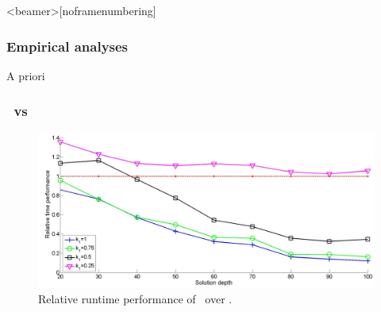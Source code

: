 \begin{frame}<beamer>[noframenumbering]
\frametitle{Empirical analyses}
	\begin{center}
		\LARGE{\textcolor{ao}{A priori}}
	\end{center}
	\begin{table}
	\centering
	\end{table}
\note{}
\end{frame}
\begin{frame} 
\frametitle{\lexgodr \ vs \lexgo}
	\begin{figure}
    	\centering
		\includegraphics[scale=0.16]{figs/lexgodr-exe-time}
		\caption{Relative runtime performance of \lexgodr \ over \lexgo.}
	\end{figure}
\note{}
\end{frame}
